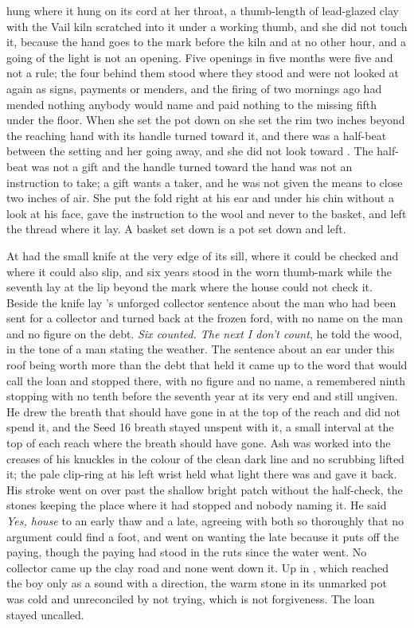  hung where it hung on its cord at her throat, a thumb-length of lead-glazed clay with the Vail kiln scratched into it under a working thumb, and she did not touch it, because the hand goes to the mark before the kiln and at no other hour, and a going of the light is not an opening. Five openings in five months were five and not a rule; the four behind them stood where they stood and were not looked at again as signs, payments or menders, and the firing of two mornings ago had mended nothing anybody would name and paid nothing to the missing fifth under the floor. When she set the pot down on  she set the rim two inches beyond the reaching hand with its handle turned toward it, and there was a half-beat between the setting and her going away, and she did not look toward . The half-beat was not a gift and the handle turned toward the hand was not an instruction to take; a gift wants a taker, and he was not given the means to close two inches of air. She put the fold right at his ear and under his chin without a look at his face, gave the instruction to the wool and never to the basket, and left the thread where it lay. A basket set down is a pot set down and left.

At   had the small knife at the very edge of its sill, where it could be checked and where it could also slip, and six years stood in the worn thumb-mark while the seventh lay at the lip beyond the mark where the house could not check it. Beside the knife lay 's unforged collector sentence about the man who had been sent for a collector and turned back at the frozen ford, with no name on the man and no figure on the debt. \emph{Six counted. The next I don't count}, he told the wood, in the tone of a man stating the weather. The sentence about an ear under this roof being worth more than the debt that held it came up to the word that would call the loan and stopped there, with no figure and no name, a remembered ninth stopping with no tenth before the seventh year at its very end and still ungiven. He drew the breath that should have gone in at the top of the reach and did not spend it, and the Seed 16 breath stayed unspent with it, a small interval at the top of each reach where the breath should have gone. Ash was worked into the creases of his knuckles in the colour of the clean dark line and no scrubbing lifted it; the pale clip-ring at his left wrist held what light there was and gave it back. His stroke went on over  past the shallow bright patch without the half-check, the stones keeping the place where it had stopped and nobody naming it. He said \emph{Yes, house} to an early thaw and a late, agreeing with both so thoroughly that no argument could find a foot, and went on wanting the late because it puts off the paying, though the paying had stood in the ruts since the water went. No collector came up the clay road and none went down it. Up in , which reached the boy only as a sound with a direction, the warm stone in its unmarked pot was cold and unreconciled by not trying, which is not forgiveness. The loan stayed uncalled.

